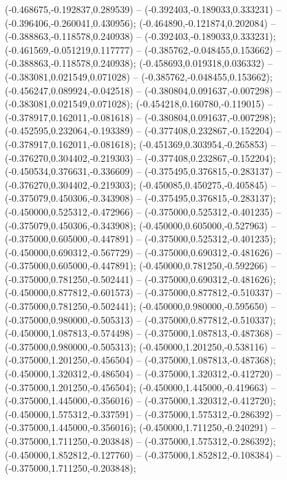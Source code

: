  (-0.468675,-0.192837,0.289539) -- (-0.392403,-0.189033,0.333231) -- (-0.396406,-0.260041,0.430956);
 (-0.464890,-0.121874,0.202084) -- (-0.388863,-0.118578,0.240938) -- (-0.392403,-0.189033,0.333231);
 (-0.461569,-0.051219,0.117777) -- (-0.385762,-0.048455,0.153662) -- (-0.388863,-0.118578,0.240938);
 (-0.458693,0.019318,0.036332) -- (-0.383081,0.021549,0.071028) -- (-0.385762,-0.048455,0.153662);
 (-0.456247,0.089924,-0.042518) -- (-0.380804,0.091637,-0.007298) -- (-0.383081,0.021549,0.071028);
 (-0.454218,0.160780,-0.119015) -- (-0.378917,0.162011,-0.081618) -- (-0.380804,0.091637,-0.007298);
 (-0.452595,0.232064,-0.193389) -- (-0.377408,0.232867,-0.152204) -- (-0.378917,0.162011,-0.081618);
 (-0.451369,0.303954,-0.265853) -- (-0.376270,0.304402,-0.219303) -- (-0.377408,0.232867,-0.152204);
 (-0.450534,0.376631,-0.336609) -- (-0.375495,0.376815,-0.283137) -- (-0.376270,0.304402,-0.219303);
 (-0.450085,0.450275,-0.405845) -- (-0.375079,0.450306,-0.343908) -- (-0.375495,0.376815,-0.283137);
 (-0.450000,0.525312,-0.472966) -- (-0.375000,0.525312,-0.401235) -- (-0.375079,0.450306,-0.343908);
 (-0.450000,0.605000,-0.527963) -- (-0.375000,0.605000,-0.447891) -- (-0.375000,0.525312,-0.401235);
 (-0.450000,0.690312,-0.567729) -- (-0.375000,0.690312,-0.481626) -- (-0.375000,0.605000,-0.447891);
 (-0.450000,0.781250,-0.592266) -- (-0.375000,0.781250,-0.502441) -- (-0.375000,0.690312,-0.481626);
 (-0.450000,0.877812,-0.601573) -- (-0.375000,0.877812,-0.510337) -- (-0.375000,0.781250,-0.502441);
 (-0.450000,0.980000,-0.595650) -- (-0.375000,0.980000,-0.505313) -- (-0.375000,0.877812,-0.510337);
 (-0.450000,1.087813,-0.574498) -- (-0.375000,1.087813,-0.487368) -- (-0.375000,0.980000,-0.505313);
 (-0.450000,1.201250,-0.538116) -- (-0.375000,1.201250,-0.456504) -- (-0.375000,1.087813,-0.487368);
 (-0.450000,1.320312,-0.486504) -- (-0.375000,1.320312,-0.412720) -- (-0.375000,1.201250,-0.456504);
 (-0.450000,1.445000,-0.419663) -- (-0.375000,1.445000,-0.356016) -- (-0.375000,1.320312,-0.412720);
 (-0.450000,1.575312,-0.337591) -- (-0.375000,1.575312,-0.286392) -- (-0.375000,1.445000,-0.356016);
 (-0.450000,1.711250,-0.240291) -- (-0.375000,1.711250,-0.203848) -- (-0.375000,1.575312,-0.286392);
 (-0.450000,1.852812,-0.127760) -- (-0.375000,1.852812,-0.108384) -- (-0.375000,1.711250,-0.203848);
